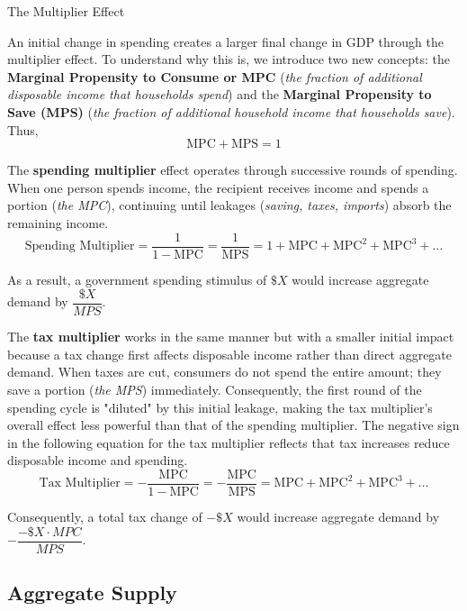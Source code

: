 \documentclass[10pt]{article}
\begin{document}
    \begin{core}[label=core:mpcs]{The Multiplier Effect}

      An initial change in spending creates a larger final change in GDP through the multiplier effect. To understand why this is, we introduce two new concepts: the \textbf{Marginal Propensity to Consume or MPC} (\textit{the fraction of additional disposable income that households spend}) and the \textbf{Marginal Propensity to Save (MPS)} (\textit{the fraction of additional household income that households save}). Thus, 
      \[
        \text{MPC} + \text{MPS} = 1
      \]

      The \textbf{spending multiplier} effect operates through successive rounds of spending. When one person spends income, the recipient receives income and spends a portion (\textit{the MPC}), continuing until leakages (\textit{saving, taxes, imports}) absorb the remaining income.
      \[
        \text{Spending Multiplier} = \frac{1}{1 - \text{MPC}} = \frac{1}{\text{MPS}} = 1 + \text{MPC} + \text{MPC}^2 + \text{MPC}^3 + \ldots
      \]

      As a result, a government spending stimulus of $\$X$ would increase aggregate demand by $\dfrac{\$X}{MPS}$.

      The \textbf{tax multiplier} works in the same manner but with a smaller initial impact because a tax change first affects disposable income rather than direct aggregate demand. When taxes are cut, consumers do not spend the entire amount; they save a portion (\textit{the MPS}) immediately. Consequently, the first round of the spending cycle is "diluted" by this initial leakage, making the tax multiplier's overall effect less powerful than that of the spending multiplier. The negative sign in the following equation for the tax multiplier reflects that tax increases reduce disposable income and spending.
      \[
        \text{Tax Multiplier} = -\frac{\text{MPC}}{1 - \text{MPC}} = -\frac{\text{MPC}}{\text{MPS}} = \text{MPC} + \text{MPC}^2 + \text{MPC}^3 + \ldots
      \]

      Consequently, a total tax change of $-\$X$ would increase aggregate demand by $-\dfrac{-\$X \cdot MPC}{MPS}$.

    \end{core}

  \subsection{Aggregate Supply}
\end{document}
